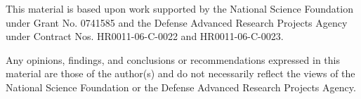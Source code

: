 \documentclass{kluwer}    %
\begin{document}
\begin{article}
{\small This material is based upon work supported by the National
  Science Foundation under Grant No. 0741585 and the Defense Advanced
  Research Projects Agency under Contract Nos. HR0011-06-C-0022 and
  HR0011-06-C-0023.


  Any opinions, findings, and conclusions or recommendations expressed
  in this material are those of the author(s) and do not necessarily
  reflect the views of the National Science Foundation or the Defense
  Advanced Research Projects Agency.  }


\theendnotes




\end{article}
\end{document}
